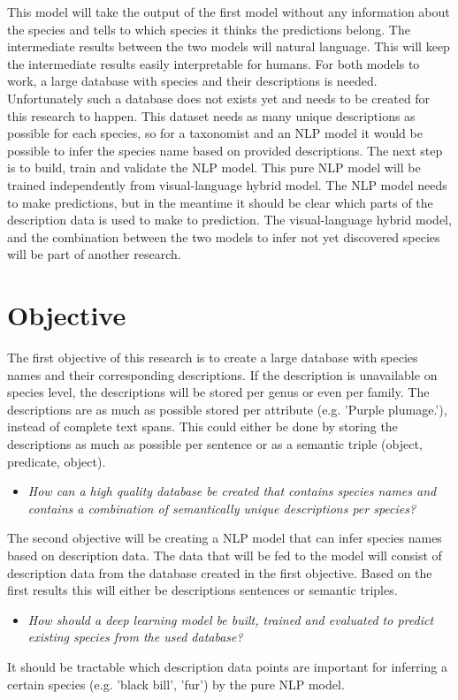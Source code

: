 \documentclass{article}
\begin{document}
This model will take the output of the first model without any information about the species and tells to which species it thinks the predictions belong.
The intermediate results between the two models will natural language.
This will keep the intermediate results easily interpretable for humans.
For both models to work, a large database with species and their descriptions is needed. 
Unfortunately such a database does not exists yet and needs to be created for this research to happen.
This dataset needs as many unique descriptions as possible for each species, so for a taxonomist and an NLP model it would be possible to infer the species name based on provided descriptions.
The next step is to build, train and validate the NLP model.
This pure NLP model will be trained independently from visual-language hybrid model. 
The NLP model needs to make predictions, but in the meantime it should be clear which parts of the description data is used to make to prediction.
The visual-language hybrid model, and the combination between the two models to infer not yet discovered species will be part of another research.



\section{Objective}
The first objective of this research is to create a large database with species names and their corresponding descriptions. 
If the description is unavailable on species level, the descriptions will be stored per genus or even per family. 
The descriptions are as much as possible stored per attribute (e.g. 'Purple plumage.'), instead of complete text spans.
This could either be done by storing the descriptions as much as possible per sentence or as a semantic triple (object, predicate, object).
\noindent 
\begin{itemize}
    \item \emph{How can a high quality database be created that contains species names and contains a combination of semantically unique descriptions per species?}
\end{itemize}
The second objective will be creating a NLP model that can infer species names based on description data. 
The data that will be fed to the model will consist of description data from the database created in the first objective. 
Based on the first results this will either be descriptions sentences or semantic triples.
\noindent 
\begin{itemize}
    \item \emph{How should a deep learning model be built, trained and evaluated to predict existing species from the used database?}
\end{itemize}
\noindent  
It should be tractable which description data points are important for inferring a certain species (e.g. 'black bill', 'fur') by the pure NLP model.
\end{document}
